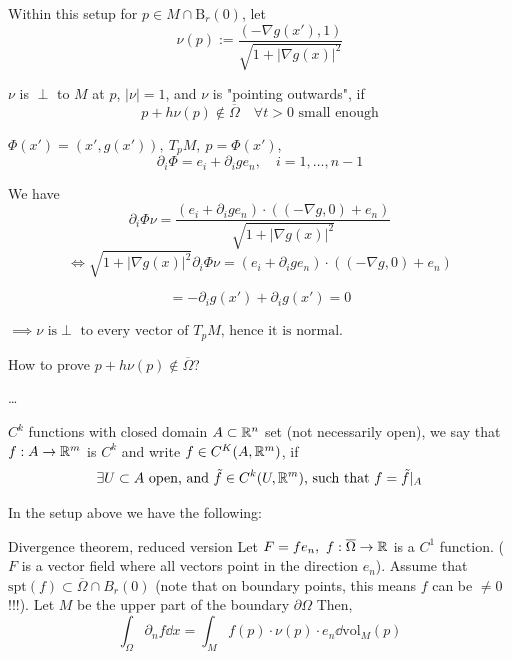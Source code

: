 \documentclass[12pt]{article}
\begin{document}
Within this setup for $p \in M \cap \mathrm{B}_r(0)$, let 
$$
    \nu(p) := \frac{(-\nabla g(x'), 1)}{\sqrt{1 + \lvert \nabla g(x) \rvert^2}}
$$

\begin{lemma}{}{}
    $\nu$ is $\perp$ to $M$ at $p$, $\lvert \nu \rvert = 1$, and $\nu$ is "pointing outwards", if
    $$
        p + h \nu(p) \notin \overline{\Omega} \quad \forall t > 0 \text{ small enough}
    $$
\end{lemma}

\begin{proofbox}
    $\Phi(x') = (x', g(x')),\ T_p M,\ p = \Phi(x')$,
    $$
        \partial_i \Phi = e_i + \partial_i g e_n, \quad i = 1,\dots,n-1
    $$

    We have
    $$
        \partial_i \Phi \nu = \frac{(e_i + \partial_i g e_n) \cdot ((-\nabla g, 0) + e_n)}{\sqrt{1 + \lvert \nabla g(x) \rvert^2}}
    $$
    $$
        \iff \sqrt{1 + \lvert \nabla g(x) \rvert^2}\partial_i \Phi \nu = (e_i + \partial_i g e_n) \cdot ((-\nabla g, 0) + e_n)
    $$

    $$
        = -\partial_ig(x') + \partial_ig(x') = 0
    $$

    $\implies \nu \text{ is} \perp \text{ to every vector of } T_pM \text{, hence it is normal}.$

    How to prove $p + h \nu(p) \notin \overline{\Omega}$?

    \dots
\end{proofbox}

\begin{definition}{$C^k$ functions with closed domain}{}
    $A \subset \mathbb{R}^n$ set (not necessarily open), we say that $f: A \rightarrow \mathbb{R}^m$ is $C^k$ and write $f \in C^K(A, \mathbb{R}^m)$, if
    $$
        \exists U \subset A \text{ open, and } \tilde{f} \in C^k(U, \mathbb{R}^m) \text{, such that } f = \tilde{f}|_A
    $$
\end{definition}

In the setup above we have the following:
\begin{lemma}{Divergence theorem, reduced version}{}
    Let $F = f e_n, \ f: \overline{\Omega} \rightarrow \mathbb{R}$ is a $C^1$ function. ($F$ is a vector field where all vectors point in the direction $e_n$). Assume that $\mathrm{spt}(f) \subset \overline{\Omega} \cap B_r(0)$ (note that on boundary points, this means $f$ can be $\neq 0$!!!). Let $M$ be the upper part of the boundary $\partial\Omega$ Then,
    $$
        \int_\Omega \partial_n f \dd x = \int_M f(p) \cdot \nu(p) \cdot e_n \dd \mathrm{vol}_M(p)
    $$
\end{lemma}
\end{document}
